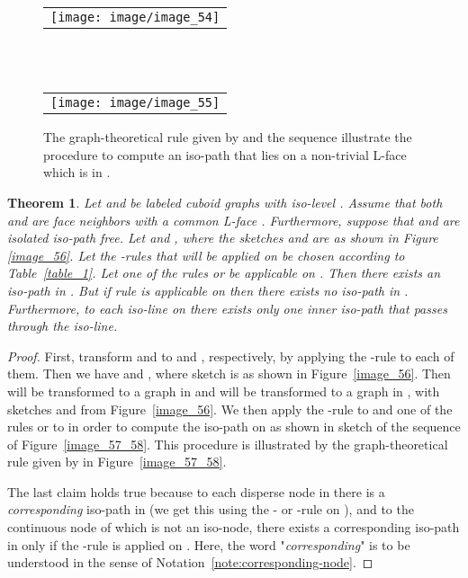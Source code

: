 \documentclass[a4paper,11pt]{article}
\newtheorem{theorem}{Theorem}[section]
\begin{document}
\begin{figure}[!ht]

\begin{tabular}[c]{l}
\texttt{[image: image/image\_54]}
\end{tabular}
\\ \\

\begin{tabular}[c]{l}
\texttt{[image: image/image\_55]}
\end{tabular}
\caption{The graph-theoretical rule given by  and the sequence  illustrate the procedure
to compute an iso-path that lies on a non-trivial L-face which is in .}
\label{image_54_55}
\end{figure}
\FloatBarrier
\begin{theorem}\label{thm:class-5}
Let  and  be labeled cuboid
graphs with iso-level . Assume that both  and  are face neighbors
with a common L-face . Furthermore, suppose that  and  are
isolated iso-path free. Let  and ,
where the sketches  and  are as shown in Figure \ref{image_56}. Let the -rules that will
be applied on  be chosen according to Table~\ref{table_1}. Let one of the rules  or  be
applicable on . Then there exists an iso-path in . But if rule  is applicable on  then
there exists no iso-path in . Furthermore, to each iso-line on  there exists only one inner iso-path
that passes through the iso-line.
\end{theorem}
\begin{proof} First, transform  and  to  and
, respectively, by applying the -rule to each of
them. Then we have  and , where sketch  is as
shown in Figure~\ref{image_56}. Then  will be transformed to a graph in
 and  will be transformed to a graph in ,
with sketches  and  from Figure~\ref{image_56}. We then apply the -rule
to  and one of the rules  or  to  in order to compute the iso-path on 
as shown in sketch  of the sequence  of Figure~\ref{image_57_58}. This procedure is
illustrated by the graph-theoretical rule given by  in Figure~\ref{image_57_58}.

The last claim holds true because to each disperse node in  there is a {\it corresponding}
iso-path in  (we get this using the - or -rule on ), and to the continuous
node of  which is not an iso-node, there exists a corresponding iso-path in  only if the
-rule is applied on . Here, the word "{\it corresponding}" is to be understood in the
sense of Notation~\ref{note:corresponding-node}.
\end{proof}
\end{document}
